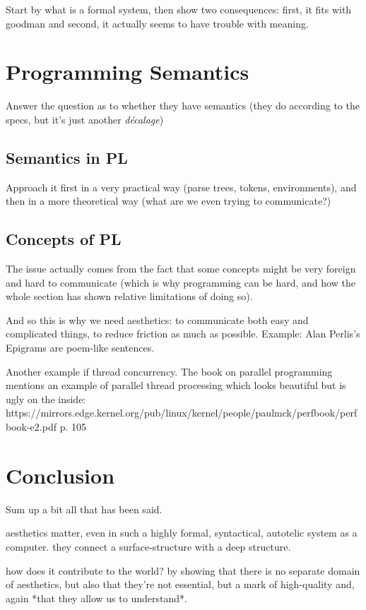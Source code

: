 \documentclass{article}
\begin{document}
Start by what is a formal system, then show two consequences: first, it fits with goodman and second, it actually seems to have trouble with meaning.

\section{Programming Semantics}

Answer the question as to whether they have semantics (they do according to the specs, but it's just another \emph{décalage})

\subsection{Semantics in PL}

Approach it first in a very practical way (parse trees, tokens, environments), and then in a more theoretical way (what are we even trying to communicate?)

\subsection{Concepts of PL}

The issue actually comes from the fact that some concepts might be very foreign and hard to communicate (which is why programming can be hard, and how the whole section has shown relative limitations of doing so).

And so this is why we need aesthetics: to communicate both easy and complicated things, to reduce friction as much as possible. Example: Alan Perlis's Epigrams are poem-like sentences.

Another example if thread concurrency. The book on parallel programming mentions an example of parallel thread processing which looks beautiful but is ugly on the inside: https://mirrors.edge.kernel.org/pub/linux/kernel/people/paulmck/perfbook/perfbook-e2.pdf p. 105

\section{Conclusion}

Sum up a bit all that has been said.

aesthetics matter, even in such a highly formal, syntactical, autotelic system as a computer. they connect a surface-structure with a deep structure.

how does it contribute to the world? by showing that there is no separate domain of aesthetics, but also that they're not essential, but a mark of high-quality and, again *that they allow us to understand*.
\end{document}
